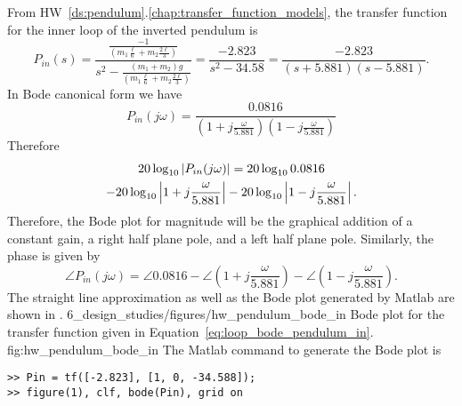 From HW~\ref{ds:pendulum}.\ref{chap:transfer_function_models}, the transfer function for the inner loop of the inverted pendulum is 
\begin{equation}\label{eq:hw_pendulum_bode_in_tf}
P_{in}(s) = \frac{\frac{-1}{(m_1 \frac{\ell}{6}+ m_2 \frac{2 \ell}{3})}}{s^2-\frac{(m_1+m_2)g}{(m_1 \frac{\ell}{6}+ m_2 \frac{2 \ell}{3})}} = 
\frac{-2.823}{s^2 - 34.58} = \frac{-2.823}{(s+5.881)(s-5.881)}.  %
\end{equation}
In Bode canonical form we have
\[
P_{in}(j\omega) = \frac{0.0816}{(1+j\frac{\omega}{5.881})(1-j\frac{\omega}{5.881})}
\]
Therefore
\begin{multline} \label{eq:loop_bode_pendulum_in}
20\log_{10}\left|P_{in}(j\omega)\right|=
	20\log_{10} 0.0816 \\
	-20\log_{10}\left|1+j\frac{\omega}{5.881}\right|
	-20\log_{10}\left|1-j\frac{\omega}{5.881}\right|.
\end{multline}
Therefore, the Bode plot for magnitude will be the graphical addition of a constant gain, a right half plane pole, and a left half plane pole.
Similarly, the phase is given by
\[
\angle P_{in}(j\omega) = 
	\angle 0.0816 
	- \angle (1+j\frac{\omega}{5.881})
	- \angle (1-j\frac{\omega}{5.881}).
\]
The straight line approximation as well as the Bode plot generated by Matlab are shown in .
	{6_design_studies/figures/hw_pendulum_bode_in}
	{Bode plot for the transfer function given in Equation~\eqref{eq:loop_bode_pendulum_in}.}
	{fig:hw_pendulum_bode_in}
The Matlab command to generate the Bode plot is
\begin{lstlisting}
>> Pin = tf([-2.823], [1, 0, -34.588]);
>> figure(1), clf, bode(Pin), grid on
\end{lstlisting}

